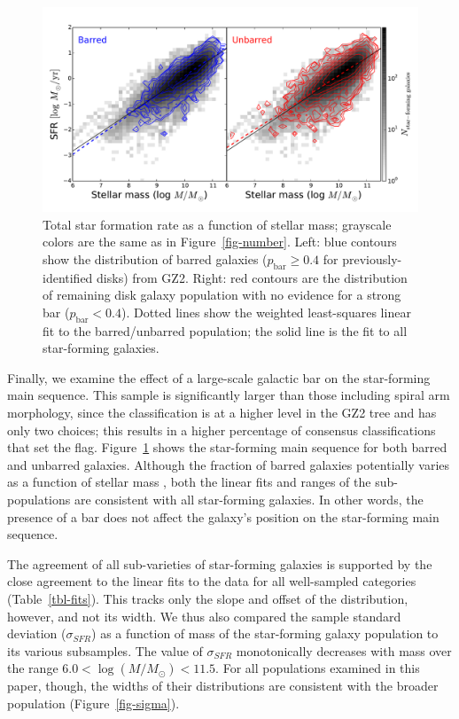 \documentclass{emulateapj}
\begin{document}
\begin{figure}
\includegraphics[angle=0,width=7.0in]{figures/ms_bar_contour.pdf}
\caption{Total star formation rate as a function of stellar mass; grayscale colors are the same as in Figure~\ref{fig-number}. Left: blue contours show the distribution of barred galaxies ($p_\textrm{bar}\ge0.4$ for previously-identified disks) from GZ2. Right: red contours are the distribution of remaining disk galaxy population with no evidence for a strong bar ($p_\textrm{bar}<0.4$). Dotted lines show the weighted least-squares linear fit to the barred/unbarred population; the solid line is the fit to all star-forming galaxies. 
\label{fig-bar}}
\end{figure}

Finally, we examine the effect of a large-scale galactic bar on the star-forming main sequence. This sample is significantly larger than those including spiral arm morphology, since the classification is at a higher level in the GZ2 tree and has only two choices; this results in a higher percentage of consensus classifications that set the flag. Figure~\ref{fig-bar} shows the star-forming main sequence for both barred and unbarred galaxies. Although the fraction of barred galaxies potentially varies as a function of stellar mass \citep{mas11c,che13}, both the linear fits and ranges of the sub-populations are consistent with all star-forming galaxies. In other words, the presence of a bar does not affect the galaxy's position on the star-forming main sequence. 

The agreement of all sub-varieties of star-forming galaxies is supported by the close agreement to the linear fits to the data for all well-sampled categories (Table~\ref{tbl-fits}). This tracks only the slope and offset of the distribution, however, and not its width. We thus also compared the sample standard deviation ($\sigma_{SFR}$) as a function of mass of the star-forming galaxy population to its various subsamples. The value of $\sigma_{SFR}$ monotonically decreases with mass over the range $6.0<\log(M/M_\odot)<11.5$. For all populations examined in this paper, though, the widths of their distributions are consistent with the broader population (Figure~\ref{fig-sigma}). 
\end{document}

